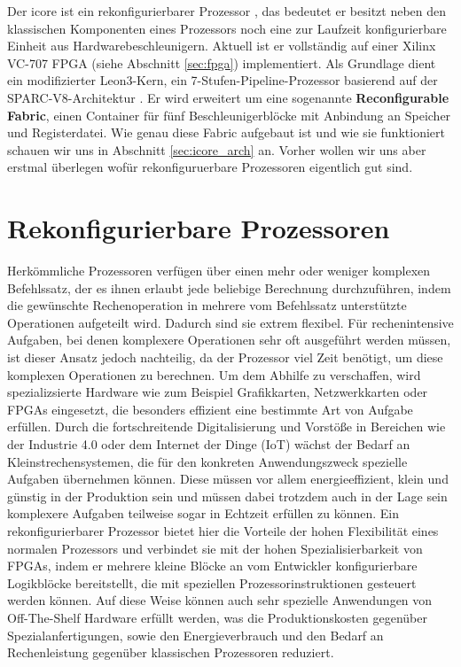 Der icore ist ein rekonfigurierbarer Prozessor , das bedeutet er besitzt neben den klassischen Komponenten
eines Prozessors noch eine zur Laufzeit konfigurierbare Einheit aus Hardwarebeschleunigern. Aktuell ist er vollständig auf einer Xilinx VC-707 FPGA (siehe Abschnitt \ref{sec:fpga}) implementiert.
Als Grundlage dient ein modifizierter Leon3-Kern, ein 7-Stufen-Pipeline-Prozessor basierend auf der SPARC-V8-Architektur .
Er wird erweitert um eine sogenannte \textbf{Reconfigurable Fabric}, einen Container für fünf Beschleunigerblöcke mit Anbindung an Speicher und Registerdatei.
Wie genau diese Fabric aufgebaut ist und wie sie funktioniert schauen wir uns in Abschnitt \ref{sec:icore_arch} an.
Vorher wollen wir uns aber erstmal überlegen wofür rekonfiguruerbare Prozessoren eigentlich gut sind.
\section{Rekonfigurierbare Prozessoren}
Herkömmliche Prozessoren verfügen über einen mehr oder weniger komplexen Befehlssatz, der es ihnen erlaubt jede beliebige Berechnung durchzuführen,
indem die gewünschte Rechenoperation in mehrere vom Befehlssatz unterstützte Operationen aufgeteilt wird. Dadurch sind sie extrem flexibel.
Für rechenintensive Aufgaben, bei denen komplexere Operationen sehr oft ausgeführt werden müssen, ist dieser Ansatz jedoch nachteilig,
da der Prozessor viel Zeit benötigt, um diese komplexen Operationen zu berechnen. Um dem Abhilfe zu verschaffen, wird spezializsierte Hardware
wie zum Beispiel Grafikkarten, Netzwerkkarten oder FPGAs eingesetzt, die besonders effizient eine bestimmte Art von Aufgabe erfüllen.
Durch die fortschreitende Digitalisierung und Vorstöße in Bereichen wie der Industrie 4.0 oder dem Internet der Dinge (IoT) wächst der Bedarf an Kleinstrechensystemen,
die für den konkreten Anwendungszweck spezielle Aufgaben übernehmen können. Diese müssen vor allem energieeffizient, klein und günstig in der Produktion sein
und müssen dabei trotzdem auch in der Lage sein komplexere Aufgaben teilweise sogar in Echtzeit erfüllen zu können.
Ein rekonfigurierbarer Prozessor bietet hier die Vorteile der hohen Flexibilität eines normalen Prozessors und verbindet sie mit der hohen Spezialisierbarkeit von FPGAs,
indem er mehrere kleine Blöcke an vom Entwickler konfigurierbare Logikblöcke bereitstellt, die mit speziellen Prozessorinstruktionen gesteuert werden können.
Auf diese Weise können auch sehr spezielle Anwendungen von Off-The-Shelf Hardware erfüllt werden, was die Produktionskosten gegenüber Spezialanfertigungen,
sowie den Energieverbrauch und den Bedarf an Rechenleistung gegenüber klassischen Prozessoren reduziert.


